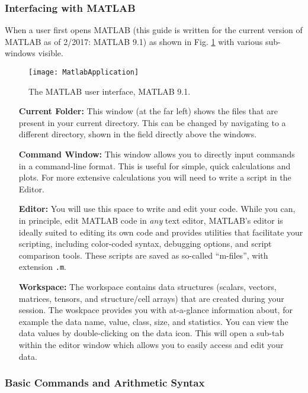 \subsubsection{Interfacing with MATLAB}

When a user first opens MATLAB (this guide is written for the current version of MATLAB as of 2/2017: MATLAB 9.1) as shown in Fig. \ref{fig:MatlabApplication} with various sub-windows visible.

\begin{figure}[!b]%
	\centering
	\texttt{[image: MatlabApplication]}%
	\caption{The MATLAB user interface, MATLAB 9.1.}%
	\label{fig:MatlabApplication}%
\end{figure}

	\begin{itemize}[align=left]
		\item [\textbf{Current Folder:}] This window (at the far left) shows the files that are present in your current directory. This can be changed by navigating to a different directory, shown in the field directly above the windows.
		\item [\textbf{Command Window:}] This window allows you to directly input commands in a command-line format. This is useful for simple, quick calculations and plots. For more extensive calculations you will need to write a script in the Editor.
		\item [\textbf{Editor:}] You will use this space to write and edit your code. While you can, in principle, edit MATLAB code in \emph{any} text editor, MATLAB's editor is ideally suited to editing its own code and provides utilities that facilitate your scripting, including color-coded syntax, debugging options, and script comparison tools. These scripts are saved as so-called ``m-files'', with extension \verb|.m|.
		\item [\textbf{Workspace:}] The workspace contains data structures (scalars, vectors, matrices, tensors, and structure/cell arrays) that are created during your session. The woskpace provides you with at-a-glance information about, for example the data name, value, class, size, and statistics. You can view the data values by double-clicking on the data icon. This will open a sub-tab within the editor window which allows you to easily access and edit your data.
	\end{itemize}


\subsubsection{Basic Commands and Arithmetic Syntax}

